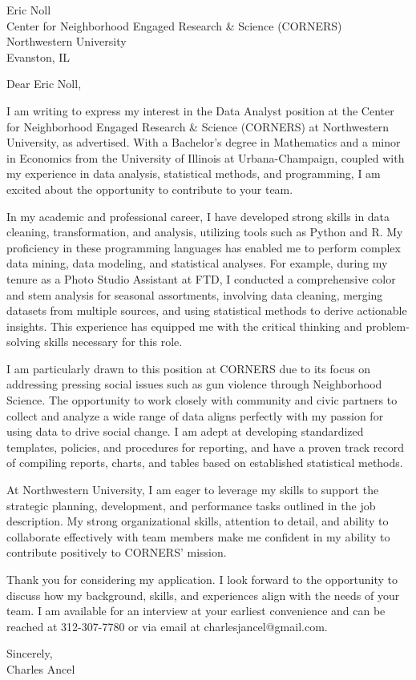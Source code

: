 \documentclass{letter}
\begin{document}
\begin{letter}{Eric Noll\\Center for Neighborhood Engaged Research \& Science (CORNERS)\\Northwestern University\\Evanston, IL}

\opening{Dear Eric Noll,}

I am writing to express my interest in the Data Analyst position at the Center for Neighborhood Engaged Research \& Science (CORNERS) at Northwestern University, as advertised. With a Bachelor's degree in Mathematics and a minor in Economics from the University of Illinois at Urbana-Champaign, coupled with my experience in data analysis, statistical methods, and programming, I am excited about the opportunity to contribute to your team.

In my academic and professional career, I have developed strong skills in data cleaning, transformation, and analysis, utilizing tools such as Python and R. My proficiency in these programming languages has enabled me to perform complex data mining, data modeling, and statistical analyses. For example, during my tenure as a Photo Studio Assistant at FTD, I conducted a comprehensive color and stem analysis for seasonal assortments, involving data cleaning, merging datasets from multiple sources, and using statistical methods to derive actionable insights. This experience has equipped me with the critical thinking and problem-solving skills necessary for this role.

I am particularly drawn to this position at CORNERS due to its focus on addressing pressing social issues such as gun violence through Neighborhood Science. The opportunity to work closely with community and civic partners to collect and analyze a wide range of data aligns perfectly with my passion for using data to drive social change. I am adept at developing standardized templates, policies, and procedures for reporting, and have a proven track record of compiling reports, charts, and tables based on established statistical methods.

At Northwestern University, I am eager to leverage my skills to support the strategic planning, development, and performance tasks outlined in the job description. My strong organizational skills, attention to detail, and ability to collaborate effectively with team members make me confident in my ability to contribute positively to CORNERS' mission.

Thank you for considering my application. I look forward to the opportunity to discuss how my background, skills, and experiences align with the needs of your team. I am available for an interview at your earliest convenience and can be reached at 312-307-7780 or via email at charlesjancel@gmail.com.

\begin{flushleft}
Sincerely,\\
Charles Ancel
\end{flushleft}

\end{letter}
\end{document}
